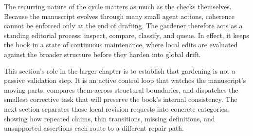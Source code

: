 \documentclass[11pt]{article}
\begin{document}
The recurring nature of the cycle matters as much as the checks themselves. Because the manuscript evolves through many small agent actions, coherence cannot be enforced only at the end of drafting. The gardener therefore acts as a standing editorial process: inspect, compare, classify, and queue. In effect, it keeps the book in a state of continuous maintenance, where local edits are evaluated against the broader structure before they harden into global drift.

This section's role in the larger chapter is to establish that gardening is not a passive validation step. It is an active control loop that watches the manuscript's moving parts, compares them across structural boundaries, and dispatches the smallest corrective task that will preserve the book's internal consistency. The next section separates those local revision requests into concrete categories, showing how repeated claims, thin transitions, missing definitions, and unsupported assertions each route to a different repair path.
\end{document}
